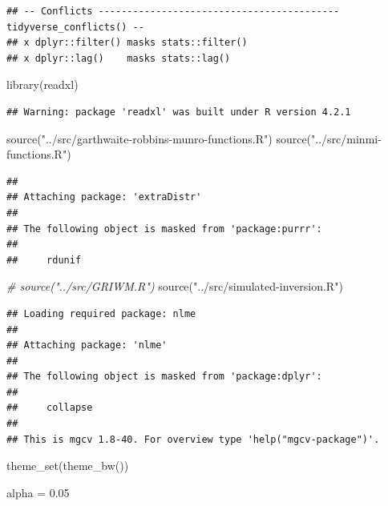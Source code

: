 \documentclass[
]{article}
\newenvironment{Shaded}{\begin{snugshade}}{\end{snugshade}}
\newcommand{\CommentTok}[1]{\textcolor[rgb]{0.56,0.35,0.01}{\textit{#1}}}
\newcommand{\FloatTok}[1]{\textcolor[rgb]{0.00,0.00,0.81}{#1}}
\newcommand{\FunctionTok}[1]{\textcolor[rgb]{0.00,0.00,0.00}{#1}}
\newcommand{\NormalTok}[1]{#1}
\newcommand{\OtherTok}[1]{\textcolor[rgb]{0.56,0.35,0.01}{#1}}
\newcommand{\StringTok}[1]{\textcolor[rgb]{0.31,0.60,0.02}{#1}}
\begin{document}
\begin{verbatim}
## -- Conflicts ------------------------------------------ tidyverse_conflicts() --
## x dplyr::filter() masks stats::filter()
## x dplyr::lag()    masks stats::lag()
\end{verbatim}

\begin{Shaded}
\begin{Highlighting}[]
\FunctionTok{library}\NormalTok{(readxl)}
\end{Highlighting}
\end{Shaded}

\begin{verbatim}
## Warning: package 'readxl' was built under R version 4.2.1
\end{verbatim}

\begin{Shaded}
\begin{Highlighting}[]
\FunctionTok{source}\NormalTok{(}\StringTok{"../src/garthwaite{-}robbins{-}munro{-}functions.R"}\NormalTok{)}
\FunctionTok{source}\NormalTok{(}\StringTok{"../src/minmi{-}functions.R"}\NormalTok{)}
\end{Highlighting}
\end{Shaded}

\begin{verbatim}
## 
## Attaching package: 'extraDistr'
## 
## The following object is masked from 'package:purrr':
## 
##     rdunif
\end{verbatim}

\begin{Shaded}
\begin{Highlighting}[]
\CommentTok{\# source("../src/GRIWM.R")}
\FunctionTok{source}\NormalTok{(}\StringTok{"../src/simulated{-}inversion.R"}\NormalTok{)}
\end{Highlighting}
\end{Shaded}

\begin{verbatim}
## Loading required package: nlme
## 
## Attaching package: 'nlme'
## 
## The following object is masked from 'package:dplyr':
## 
##     collapse
## 
## This is mgcv 1.8-40. For overview type 'help("mgcv-package")'.
\end{verbatim}

\begin{Shaded}
\begin{Highlighting}[]
\FunctionTok{theme\_set}\NormalTok{(}\FunctionTok{theme\_bw}\NormalTok{())}

\NormalTok{alpha }\OtherTok{=} \FloatTok{0.05}
\end{Highlighting}
\end{Shaded}
\end{document}
